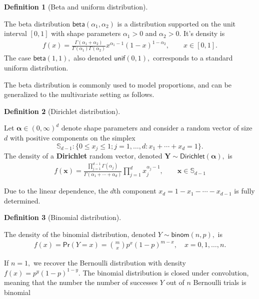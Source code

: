 \documentclass[
  11pt,
  letterpaper,
]{scrbook}
\theoremstyle{definition}
\newtheorem{definition}{Definition}[chapter]
\theoremstyle{plain}
\theoremstyle{plain}
\theoremstyle{definition}
\theoremstyle{definition}
\theoremstyle{remark}
\begin{document}
\begin{definition}[Beta and uniform
distribution]\protect\hypertarget{def-beta}{}\label{def-beta}

The beta distribution \(\mathsf{beta}(\alpha_1, \alpha_2)\) is a
distribution supported on the unit interval \([0,1]\) with shape
parameters \(\alpha_1>0\) and \(\alpha_2>0.\) It's density is
\begin{align*}
f(x) = \frac{\Gamma(\alpha_1+\alpha_2)}{\Gamma(\alpha_1)\Gamma(\alpha_2)}x^{\alpha_1-1}(1-x)^{1-\alpha_2}, \qquad x \in [0,1].
\end{align*} The case \(\mathsf{beta}(1,1),\) also denoted
\(\mathsf{unif}(0,1),\) corresponds to a standard uniform distribution.

\end{definition}

The beta distribution is commonly used to model proportions, and can be
generalized to the multivariate setting as follows.

\begin{definition}[Dirichlet
distribution]\protect\hypertarget{def-dirichlet-dist}{}\label{def-dirichlet-dist}

Let \(\boldsymbol{\alpha} \in (0, \infty)^d\) denote shape parameters
and consider a random vector of size \(d\) with positive components on
the simplex
\[\mathbb{S}_{d-1}: \{ 0 \leq x_j \leq 1; j=1, \ldots, d: x_1 + \cdots + x_d=1\}.\]
The density of a \textbf{Dirichlet} random vector, denoted
\(\boldsymbol{Y} \sim \mathsf{Dirichlet}(\boldsymbol{\alpha}),\) is
\begin{align*}
f(\boldsymbol{x}) = \frac{\prod_{j=1}^{d-1}\Gamma(\alpha_j)}{\Gamma(\alpha_1 + \cdots + \alpha_d)}\prod_{j=1}^{d} x_j^{\alpha_j-1}, \qquad \boldsymbol{x} \in \mathbb{S}_{d-1}
\end{align*}

Due to the linear dependence, the \(d\)th component
\(x_d = 1- x_1 - \cdots - x_{d-1}\) is fully determined.

\end{definition}

\begin{definition}[Binomial
distribution]\protect\hypertarget{def-binomial}{}\label{def-binomial}

The density of the binomial distribution, denoted
\(Y \sim \mathsf{binom}(n, p),\) is \begin{align*}
f(x) = \mathsf{Pr}(Y=x) = \binom{m}{x}p^x (1-p)^{m-x}, \quad x=0, 1, \ldots, n.
\end{align*}

If \(n=1,\) we recover the Bernoulli distribution with density
\(f(x) = p^{y}(1-p)^{1-y}.\) The binomial distribution is closed under
convolution, meaning that the number the number of successes \(Y\) out
of \(n\) Bernoulli trials is binomial

\end{definition}
\end{document}
